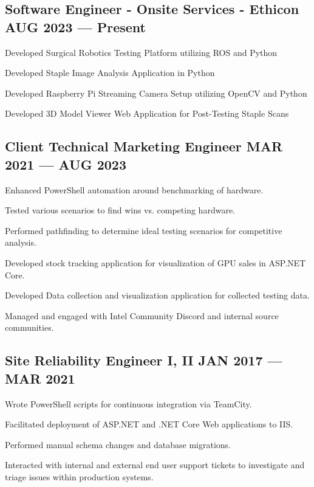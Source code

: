 \subsection{{Software Engineer - Onsite Services - Ethicon \hfill AUG 2023 --- Present}}
\begin{zitemize}
\item Developed Surgical Robotics Testing Platform utilizing ROS and Python
\item Developed Staple Image Analysis Application in Python
\item Developed Raspberry Pi Streaming Camera Setup utilizing OpenCV and Python
\item Developed 3D Model Viewer Web Application for Post-Testing Staple Scans
\end{zitemize}

\subsection{{Client Technical Marketing Engineer \hfill MAR 2021 --- AUG 2023}}
\begin{zitemize}
\item Enhanced PowerShell automation around benchmarking of hardware.
\item Tested various scenarios to find wins vs. competing hardware.
\item Performed pathfinding to determine ideal testing scenarios for competitive analysis.
\item Developed stock tracking application for visualization of GPU sales in ASP.NET Core.
\item Developed Data collection and visualization application for collected testing data.
\item Managed and engaged with Intel Community Discord and internal source communities.
\end{zitemize}

\subsection{{Site Reliability Engineer I, II \hfill JAN 2017 --- MAR 2021}}
\begin{zitemize}
\item Wrote PowerShell scripts for continuous integration via TeamCity.
\item Facilitated deployment of ASP.NET and .NET Core Web applications to IIS.
\item Performed manual schema changes and database migrations.
\item Interacted with internal and external end user support tickets to investigate and triage issues within production systems.
\end{zitemize}

